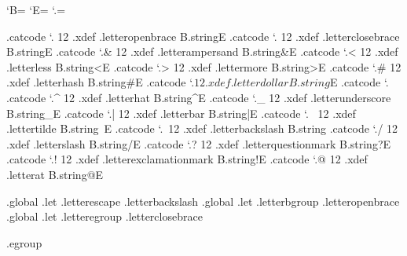 

\unprotect


\newif\ifeightbitcharacters  \eightbitcharacterstrue


\bgroup

\catcode`B=\@@begingroup
\catcode`E=\@@endgroup
\catcode`.=\@@escape

.catcode `.{ 12 .xdef .letteropenbrace       B.string{E
.catcode `.} 12 .xdef .letterclosebrace      B.string}E
.catcode `.& 12 .xdef .letterampersand       B.string&E
.catcode `.< 12 .xdef .letterless            B.string<E
.catcode `.> 12 .xdef .lettermore            B.string>E
.catcode `.# 12 .xdef .letterhash            B.string#E
.catcode `.$ 12 .xdef .letterdollar          B.string$E
.catcode `.%
.catcode `.^ 12 .xdef .letterhat             B.string^E
.catcode `._ 12 .xdef .letterunderscore      B.string_E
.catcode `.| 12 .xdef .letterbar             B.string|E
.catcode `.~ 12 .xdef .lettertilde           B.string~E
.catcode `.\ 12 .xdef .letterbackslash       B.string\E
.catcode `./ 12 .xdef .letterslash           B.string/E
.catcode `.? 12 .xdef .letterquestionmark    B.string?E
.catcode `.! 12 .xdef .letterexclamationmark B.string!E
.catcode `.@ 12 .xdef .letterat              B.string@E

         .global .let .letterescape .letterbackslash
         .global .let .letterbgroup .letteropenbrace
         .global .let .letteregroup .letterclosebrace

.egroup

\protect \endinput
